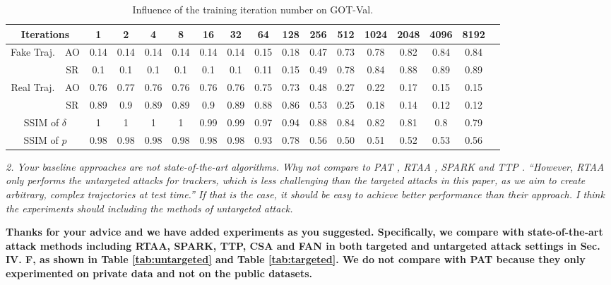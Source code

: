 \documentclass[12pt]{article}
\begin{document}
\begin{table}[h]
    \centering
    \renewcommand\tabcolsep{5.5pt} %
    \caption{Influence of the training iteration number on GOT-Val.}
    \begin{tabular}{cc|ccccccccccccccc} 
    \toprule
    \multicolumn{2}{c|}{Iterations}     & 1     & 2     & 4     & 8     & 16    & 32    & 64    & 128   & 256   & 512   & 1024  & 2048  & 4096  & 8192  \\ 
    \midrule
    \multirow{2}{*}{Fake Traj.} & AO    &  0.14 & 0.14 & 0.14 & 0.14 & 0.14 & 0.14 & 0.15 & 0.18 & 0.47 & 0.73 & 0.78 & 0.82 & 0.84 & 0.84  \\
                                & SR    &  0.1 & 0.1 & 0.1 & 0.1 & 0.1 & 0.1 & 0.11 & 0.15 & 0.49 & 0.78 & 0.84 & 0.88 & 0.89 & 0.89    \\ 
    \midrule
    \multirow{2}{*}{Real Traj.} & AO   & 0.76 & 0.77 & 0.76 & 0.76 & 0.76 & 0.76 & 0.75 & 0.73 & 0.48 & 0.27 & 0.22 & 0.17 & 0.15 & 0.15    \\
                                & SR   & 0.89 & 0.9 & 0.89 & 0.89 & 0.9 & 0.89 & 0.88 & 0.86 & 0.53 & 0.25 & 0.18 & 0.14 & 0.12 & 0.12    \\ 
    \midrule
    \multicolumn{2}{c|}{SSIM of $\delta$}&   1 & 1 & 1 & 1 & 0.99 & 0.99 & 0.97 & 0.94 & 0.88 & 0.84 & 0.82 & 0.81 & 0.8 & 0.79\\
    \midrule
    \multicolumn{2}{c|}{SSIM of $p$}      &  0.98 & 0.98 & 0.98 & 0.98 & 0.98 & 0.98 & 0.93 & 0.78 & 0.56 & 0.50 & 0.51 & 0.52 & 0.53 & 0.56\\
    \bottomrule
    \end{tabular}
    \label{tab:iter}
\end{table}

\textit{2. Your baseline approaches are not state-of-the-art algorithms. Why not compare to PAT \cite{PAT}, RTAA \cite{RTAA}, SPARK \cite{SPARK} and TTP \cite{TTP}. “However, RTAA only performs the untargeted attacks for trackers, which is less challenging than the targeted attacks in this paper, as we aim to create arbitrary, complex trajectories at test time.” If that is the case, it should be easy to achieve better performance than their approach. I think the experiments should including the methods of untargeted attack.}

\textbf{
Thanks for your advice and we have added experiments as you suggested. Specifically, we compare with state-of-the-art attack methods including RTAA, SPARK, TTP, CSA and FAN in both targeted and untargeted attack settings in Sec. IV. F, as shown in Table \ref{tab:untargeted} and Table \ref{tab:targeted}. 
We do not compare with PAT because they only experimented on private data and not on the public datasets.}
\end{document}
